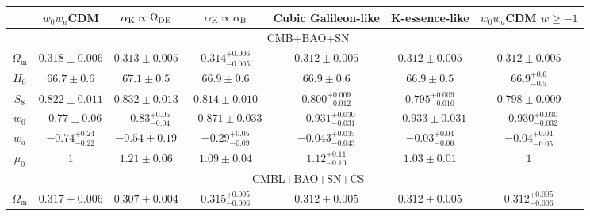 \documentclass[%
reprint,
superscriptaddress,
preprint numbers,
nofootinbib,
amsmath,amssymb,
aps,
prd
]{revtex4-2}
\begin{document}

\begin{table}[]
    \centering
    \begin{tabular}{|c|c|c|c|c|c|c|}
        \hline
         & $w_0w_a$CDM & $\alpha_{\rm K} \propto \Omega_\mathrm{DE}$ & $\alpha_{\rm K} \propto \alpha_{\rm B}$ & Cubic Galileon-like & K-essence-like & $w_0w_a$CDM $w \geq -1$  \\
        \hline
        & \multicolumn{6}{c|}{CMB+BAO+SN}\\
        \hline
        $\Omega_\mathrm{m}$ & $0.318 \pm 0.006$ & $0.313 \pm 0.005$ & $0.314^{+0.006}_{-0.005}$ & $0.312 \pm 0.005$ & $0.312 \pm 0.005$ & $0.312 \pm 0.005$ \\ \hline
        $H_0$ & $66.7 \pm 0.6$ & $67.1 \pm 0.5$ & $66.9 \pm 0.6$ & $66.9 \pm 0.6$ & $66.9 \pm 0.5$ & $66.9^{+0.6}_{-0.5}$ \\ \hline
        $S_8$ & $0.822 \pm 0.011$ & $0.832 \pm 0.013$ & $0.814 \pm 0.010$ & $0.800^{+0.009}_{-0.012}$ & $0.795^{+0.009}_{-0.010}$ & $0.798 \pm 0.009$ \\ \hline
        $w_0$ & $-0.77 \pm 0.06$ & $-0.83^{+0.05}_{-0.04}$ & $-0.871 \pm 0.033$ & $-0.931^{+0.030}_{-0.031}$ & $-0.933 \pm 0.031$ & $-0.930^{+0.030}_{-0.032}$ \\ \hline
        $w_a$ & $-0.74^{+0.24}_{-0.22}$ & $-0.54 \pm 0.19$ & $-0.29^{+0.05}_{-0.09}$ & $-0.043^{+0.035}_{-0.043}$ & $-0.03^{+0.04}_{-0.06}$ & $-0.04^{+0.04}_{-0.05}$ \\ \hline
        $\mu_0$ & $1$ & $1.21 \pm 0.06$ & $1.09 \pm 0.04$ & $1.12^{+0.11}_{-0.10}$ & $1.03 \pm 0.01$ & $1$ \\ \hline
        \hline
        & \multicolumn{6}{c|}{CMBL+BAO+SN+CS}\\
        \hline
        $\Omega_\mathrm{m}$ & $0.317 \pm 0.006$ & $0.307 \pm 0.004$ & $0.315^{+0.005}_{-0.006}$ & $0.312 \pm 0.005$ & $0.312 \pm 0.005$ & $0.312^{+0.005}_{-0.006}$ \\ \hline

\end{tabular}
\end{table}
\end{document}

